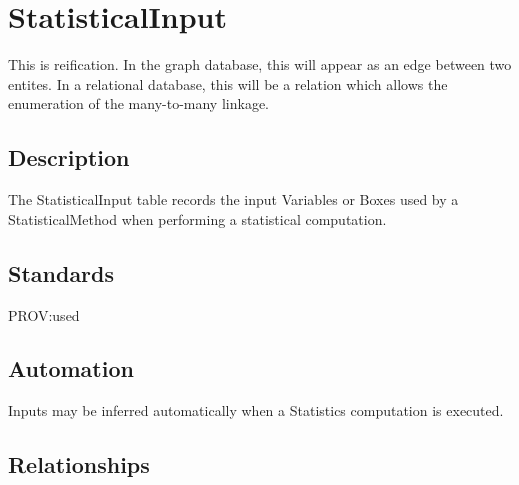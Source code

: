 \section{StatisticalInput}\label{statisticalinput}

This is reification. In the graph database, this will appear as an edge
between two entites. In a relational database, this will be a relation
which allows the enumeration of the many-to-many linkage.

\subsection{Description}\label{description-28}

The StatisticalInput table records the input Variables or Boxes used by
a StatisticalMethod when performing a statistical computation.

\subsection{Standards}\label{standards-30}

PROV:used

\subsection{Automation}\label{automation-30}

Inputs may be inferred automatically when a Statistics computation is
executed.

\subsection{Relationships}\label{relationships-25}

